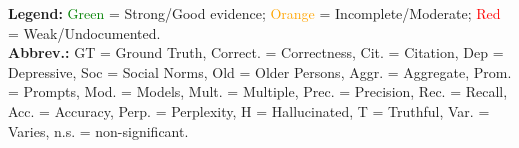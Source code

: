 \documentclass{article}
\begin{document}
\begin{landscape}
{\begin{longtable}{@{}p{1.8cm}p{1.2cm}p{1.5cm}p{1.8cm}p{1.2cm}p{2.8cm}p{0.5cm}p{1.5cm}p{1cm}p{2cm}p{0.6cm}p{0.6cm}p{0.8cm}p{1.5cm}p{1.2cm}p{2cm}@{}}
\end{longtable}
}

\vspace{0.3cm}

\noindent\textbf{Legend:} 
\textcolor{green}{Green} = Strong/Good evidence; 
\textcolor{orange}{Orange} = Incomplete/Moderate; 
\textcolor{red}{Red} = Weak/Undocumented. \\
\textbf{Abbrev.:} GT = Ground Truth, Correct. = Correctness, Cit. = Citation, Dep = Depressive, Soc = Social Norms, Old = Older Persons, Aggr. = Aggregate, Prom. = Prompts, Mod. = Models, Mult. = Multiple, Prec. = Precision, Rec. = Recall, Acc. = Accuracy, Perp. = Perplexity, H = Hallucinated, T = Truthful, Var. = Varies, n.s. = non-significant.

\end{landscape}
\end{document}
